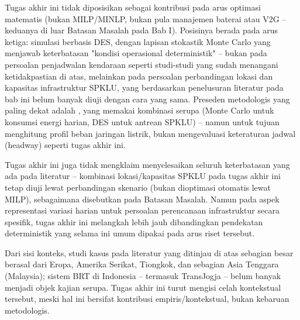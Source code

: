 Tugas akhir ini tidak diposisikan sebagai kontribusi pada arus optimasi
matematis (bukan MILP/MINLP, bukan pula manajemen baterai atau V2G --
keduanya di luar Batasan Masalah pada Bab I). Posisinya berada pada arus
ketiga: simulasi berbasis DES, dengan lapisan stokastik Monte Carlo yang
menjawab keterbatasan "kondisi operasional deterministik" -- bukan pada
persoalan penjadwalan kendaraan seperti studi-studi yang sudah menangani
ketidakpastian di atas, melainkan pada persoalan perbandingan lokasi dan
kapasitas infrastruktur SPKLU, yang berdasarkan penelusuran literatur pada
bab ini belum banyak diuji dengan cara yang sama. Preseden metodologis yang paling dekat adalah \textcite{rios2014}, yang memakai kombinasi
serupa (Monte Carlo untuk konsumsi energi harian, DES untuk antrean SPKLU)
-- namun untuk tujuan menghitung profil beban jaringan listrik, bukan
mengevaluasi keteraturan jadwal (headway) seperti tugas akhir ini.

Tugas akhir ini juga tidak mengklaim menyelesaikan seluruh keterbatasan
yang ada pada literatur -- kombinasi lokasi/kapasitas SPKLU pada tugas
akhir ini tetap diuji lewat perbandingan skenario (bukan dioptimasi
otomatis lewat MILP), sebagaimana disebutkan pada Batasan Masalah. Namun
pada aspek representasi variasi harian untuk persoalan perencanaan
infrastruktur secara spesifik, tugas akhir ini melangkah lebih jauh
dibandingkan pendekatan deterministik yang selama ini umum dipakai pada
arus riset tersebut.

Dari sisi konteks, studi kasus pada literatur yang ditinjau di atas
sebagian besar berasal dari Eropa, Amerika Serikat, Tiongkok, dan sebagian
Asia Tenggara (Malaysia); sistem BRT di Indonesia -- termasuk TransJogja --
belum banyak menjadi objek kajian serupa. Tugas akhir ini turut mengisi
celah kontekstual tersebut, meski hal ini bersifat kontribusi
empiris/kontekstual, bukan kebaruan metodologis.
